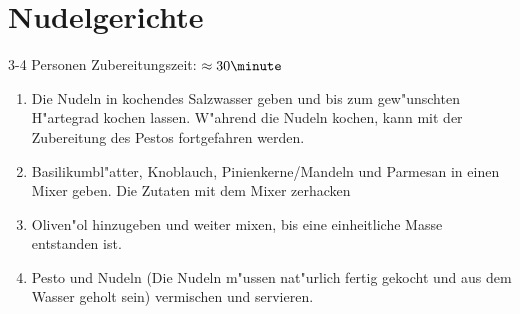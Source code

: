 \chapter{Nudelgerichte}
3-4 Personen \hfill Zubereitungszeit: $\approx30 \minute$
\hspace{0em}\\
\begin{enumerate}
\item   Die Nudeln in kochendes Salzwasser geben und bis zum gew"unschten H"artegrad kochen lassen.
        W"ahrend die Nudeln kochen, kann mit der Zubereitung des Pestos fortgefahren werden.
\item   Basilikumbl"atter, Knoblauch, Pinienkerne/Mandeln und Parmesan in einen Mixer geben.
        Die Zutaten mit dem Mixer zerhacken
\item   Oliven"ol hinzugeben und weiter mixen, bis eine einheitliche Masse entstanden ist.
\item   Pesto und Nudeln (Die Nudeln m"ussen nat"urlich fertig gekocht und aus dem Wasser geholt sein) vermischen und servieren.
\end{enumerate}
